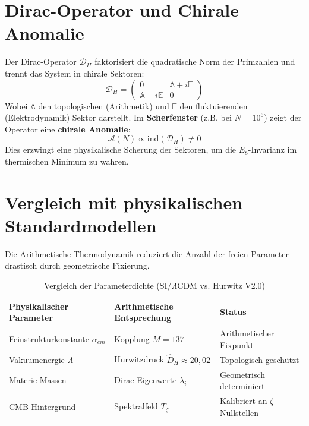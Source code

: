 \documentclass[11pt,a4paper]{article}
\begin{document}
	\section{Dirac-Operator und Chirale Anomalie}
	Der Dirac-Operator $\mathcal{D}_H$ faktorisiert die quadratische Norm der Primzahlen und trennt das System in chirale Sektoren:
	\begin{equation}
		\mathcal{D}_H = \begin{pmatrix} 0 & \mathbb{A} + i\mathbb{E} \\ \mathbb{A} - i\mathbb{E} & 0 \end{pmatrix}
	\end{equation}
	Wobei $\mathbb{A}$ den topologischen (Arithmetik) und $\mathbb{E}$ den fluktuierenden (Elektrodynamik) Sektor darstellt. Im \textbf{Scherfenster} (z.B. bei $N=10^6$) zeigt der Operator eine \textbf{chirale Anomalie}:
	\begin{equation}
		\mathcal{A}(N) \propto \text{ind}(\mathcal{D}_H) \neq 0
	\end{equation}
	Dies erzwingt eine physikalische Scherung der Sektoren, um die $E_8$-Invarianz im thermischen Minimum zu wahren.
	
	\section{Vergleich mit physikalischen Standardmodellen}
	Die Arithmetische Thermodynamik reduziert die Anzahl der freien Parameter drastisch durch geometrische Fixierung.
	
	\begin{table}[h]
		\centering
		\begin{tabular}{@{}lll@{}}
			\toprule
			Physikalischer Parameter & Arithmetische Entsprechung & Status \\
			\midrule
			Feinstrukturkonstante $\alpha_{em}$ & Kopplung $M=137$ & Arithmetischer Fixpunkt \\
			Vakuumenergie $\Lambda$ & Hurwitzdruck $\hat{D}_H \approx 20,02$ & Topologisch geschützt \\
			Materie-Massen & Dirac-Eigenwerte $\lambda_i$ & Geometrisch determiniert \\
			CMB-Hintergrund & Spektralfeld $T_{\zeta}$ & Kalibriert an $\zeta$-Nullstellen \\
			\bottomrule
		\end{tabular}
		\caption{Vergleich der Parameterdichte (SI/$\Lambda$CDM vs. Hurwitz V2.0)}
	\end{table}
	
\end{document}
